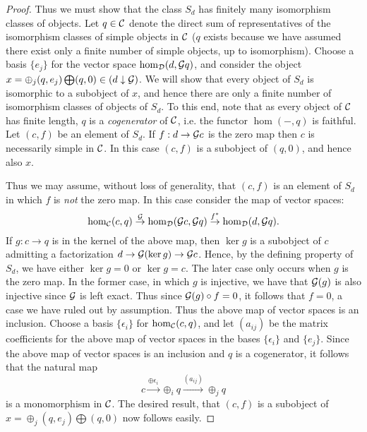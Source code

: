\documentclass{amsart}
\begin{document}
\begin{proof}
Thus we must show that the class $S_d$ has finitely many isomorphism classes of objects. Let $q \in \mathcal C$ denote the direct sum of representatives of the isomorphism classes of simple objects in $\mathcal C$ ($q$ exists because we have assumed there exist only a finite number of simple objects, up to isomorphism). Choose a basis $\{e_j\}$ for the vector space $\hom_{\mathcal D}(d, \mathcal G q)$, and consider the object $x = \oplus_j( q, e_j) \bigoplus (q,0) \in (d \downarrow \mathcal G)$. We will show that every object of $S_d$ is isomorphic to a subobject of $x$, and hence there are only a finite number of isomorphism classes of objects of $S_d$. To this end, note that as every object of $\mathcal C$ has finite length, $q$ is a {\em cogenerator} of $\mathcal C$, i.e. the functor $\hom(-, q)$ is faithful. Let $(c, f)$ be an element of $S_d$. If $f: d \to \mathcal G c$ is the zero map then $c$ is necessarily simple in $\mathcal C$. In this case $(c, f)$ is a subobject of $(q, 0)$, and hence also $x$. 

Thus we may assume, without loss of generality, that  $(c, f)$ is an element of $S_d$ in which $f$ is {\em not} the zero map. In this case consider the map of vector spaces:
\begin{equation*}
	\hom_{\mathcal C}(c,q) \stackrel{\mathcal G}{\to} \hom_{\mathcal D}(\mathcal G c, \mathcal G q) \stackrel{f^*}{\to} \hom_{\mathcal D}(d, \mathcal G q).
\end{equation*} 
If $g: c \to q$ is in the kernel of the above map, then $\ker g$ is a subobject of $c$ admitting a factorization $d \to \mathcal G(\ker g) \to \mathcal G c$. Hence, by the defining property of $S_d$, we have either $\ker g = 0$ or $\ker g = c$. The later case only occurs when $g$ is the zero map. In the former case, in which $g$ is injective, we have that $\mathcal G(g)$ is also injective since $\mathcal G$ is left exact. Thus since $\mathcal G(g) \circ f = 0$, it follows that $f = 0$, a case we have ruled out by assumption. Thus the above map of vector spaces is an inclusion. Choose a basis  $\{ \epsilon_i \}$ for $\hom_{\mathcal C}(c,q)$, and let $(a_{ij})$ be the matrix coefficients for the above map of vector spaces in the bases $\{ \epsilon_i \}$ and $\{ e_j \}$. Since the above map of vector spaces is an inclusion and $q$ is a cogenerator, it follows that the natural map
\begin{equation*}
	c \stackrel{\oplus \epsilon_i}{\to} \oplus_i q \stackrel{(a_{ij}) }{\to} \oplus_j q
\end{equation*} 
is a monomorphism in $\mathcal C$. The desired result, that $(c,f)$ is a subobject of $x = \oplus_j( q, e_j) \bigoplus (q,0)$ now follows easily. 
\end{proof}
\end{document}
